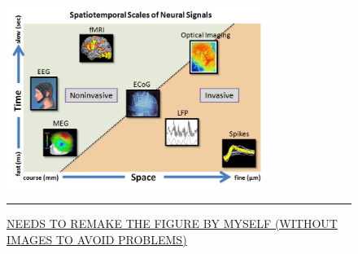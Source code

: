 \documentclass[preprint,12pt]{elsarticle}
\begin{document}
\begin{figure}[htbp]
\centering
\includegraphics[width=0.75\textwidth]{images/bmitypes.jpg}
\rule{35em}{0.5pt}
\caption[A Utah Array]{\href{http://lifesciences.ieee.org/publications/newsletter/april-2012/96-building-brain-machine-interfaces-neuroprosthetic-control-with-electrocorticographic-signals}{NEEDS TO REMAKE THE FIGURE BY MYSELF (WITHOUT IMAGES TO AVOID PROBLEMS)}}
\label{fig:bmitypes}
\end{figure}
\end{document}
